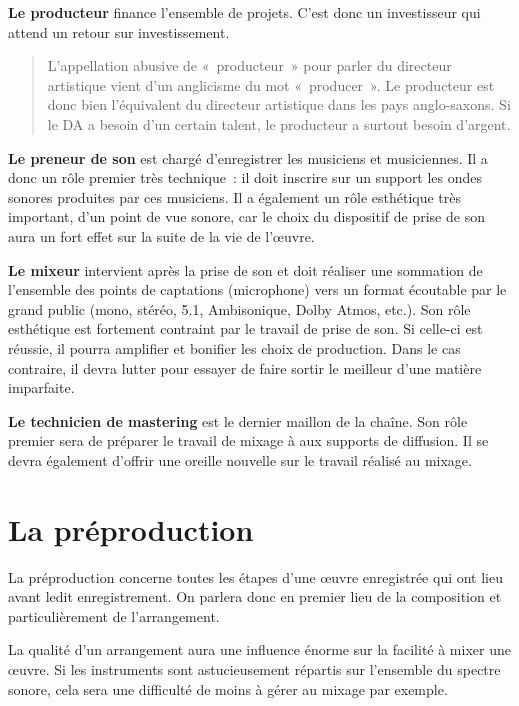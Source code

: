 \documentclass[
]{book}
\begin{document}
\textbf{Le producteur} finance l'ensemble de projets. C'est donc un investisseur qui attend un retour sur investissement.

\begin{quote}
L'appellation abusive de «~producteur~» pour parler du directeur artistique vient d'un anglicisme du mot «~producer~». Le producteur est donc bien l'équivalent du directeur artistique dans les pays anglo-saxons. Si le DA a besoin d'un certain talent, le producteur a surtout besoin d'argent.
\end{quote}

\textbf{Le preneur de son} est chargé d'enregistrer les musiciens et musiciennes. Il a donc un rôle premier très technique~: il doit inscrire sur un support les ondes sonores produites par ces musiciens. Il a également un rôle esthétique très important, d'un point de vue sonore, car le choix du dispositif de prise de son aura un fort effet sur la suite de la vie de l'œuvre.

\textbf{Le mixeur} intervient après la prise de son et doit réaliser une sommation de l'ensemble des points de captations (microphone) vers un format écoutable par le grand public (mono, stéréo, 5.1, Ambisonique, Dolby Atmos, etc.). Son rôle esthétique est fortement contraint par le travail de prise de son. Si celle-ci est réussie, il pourra amplifier et bonifier les choix de production. Dans le cas contraire, il devra lutter pour essayer de faire sortir le meilleur d'une matière imparfaite.

\textbf{Le technicien de mastering} est le dernier maillon de la chaîne. Son rôle premier sera de préparer le travail de mixage à aux supports de diffusion. Il se devra également d'offrir une oreille nouvelle sur le travail réalisé au mixage.

\hypertarget{la-pruxe9production}{%
\section{La préproduction}\label{la-pruxe9production}}

La préproduction concerne toutes les étapes d'une œuvre enregistrée qui ont lieu avant ledit enregistrement. On parlera donc en premier lieu de la composition et particulièrement de l'arrangement.

La qualité d'un arrangement aura une influence énorme sur la facilité à mixer une œuvre. Si les instruments sont astucieusement répartis sur l'ensemble du spectre sonore, cela sera une difficulté de moins à gérer au mixage par exemple.
\end{document}
